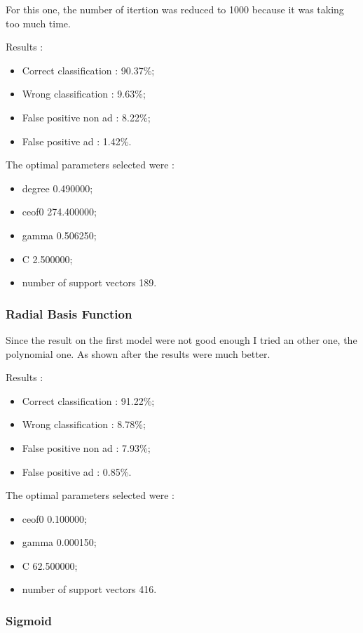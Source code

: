 For this one, the number of itertion was reduced to 1000 because it was taking too much time.

Results :
\begin{itemize}
  \item Correct classification : 90.37\%;
  \item Wrong classification : 9.63\%;
  \item False positive non ad : 8.22\%;
  \item False positive ad : 1.42\%.
\end{itemize}

The optimal parameters selected were :
\begin{itemize}
  \item degree 0.490000;
  \item ceof0 274.400000;
  \item gamma 0.506250;
  \item C 2.500000;
  \item number of support vectors 189.
\end{itemize}


\subsubsection{Radial Basis Function}

Since the result on the first model were not good enough I tried an other one, the polynomial one. As shown after the results were much better.

Results :
\begin{itemize}
  \item Correct classification : 91.22\%;
  \item Wrong classification : 8.78\%;
  \item False positive non ad : 7.93\%;
  \item False positive ad : 0.85\%.
\end{itemize}

The optimal parameters selected were :
\begin{itemize}
  \item ceof0 0.100000;
  \item gamma 0.000150;
  \item C 62.500000;
  \item number of support vectors 416.
\end{itemize}


\subsubsection{Sigmoid}

